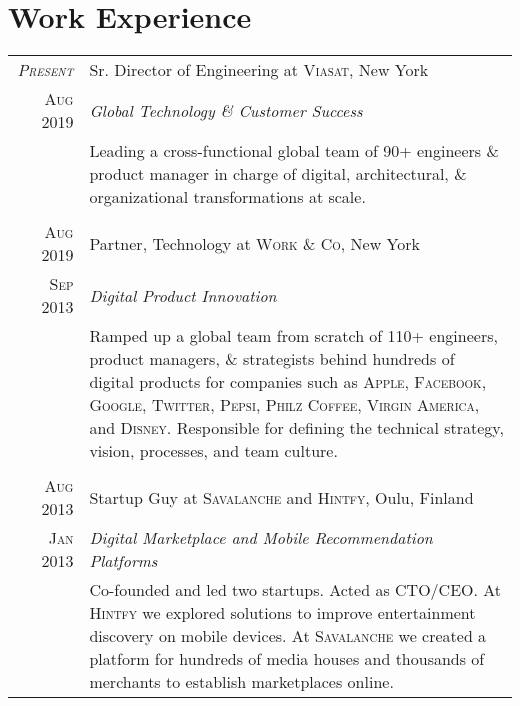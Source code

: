 \documentclass[a4paper,10pt]{article}
\begin{document}
\section{Work Experience}
\begin{tabular}{r|p{11cm}}
  \textsc{\emph{Present}} & Sr. Director of Engineering at \textsc{Viasat}, New York \\

  \textsc{Aug 2019} & \emph{Global Technology \& Customer Success}\\

  &\footnotesize{Leading a cross-functional global team of 90+
    engineers \& product manager in charge of digital, architectural,
    \& organizational transformations at scale.}\\

  \multicolumn{2}{c}{}\\

  \textsc{Aug 2019} & Partner, Technology at \textsc{Work \& Co}, New York \\

  \textsc{Sep 2013} & \emph{Digital Product Innovation}\\

  &\footnotesize{Ramped up a global team from scratch of 110+
    engineers, product managers, \& strategists behind hundreds of
    digital products for companies such as \textsc{Apple},
    \textsc{Facebook}, \textsc{Google}, \textsc{Twitter},
    \textsc{Pepsi}, \textsc{Philz Coffee}, \textsc{Virgin America},
    and \textsc{Disney}. Responsible for defining the technical
    strategy, vision, processes, and team culture.}\\

  \multicolumn{2}{c}{}\\

  \textsc{Aug 2013} & Startup Guy at \textsc{Savalanche} and \textsc{Hintfy}, Oulu, Finland \\

  \textsc{Jan 2013} & \emph{Digital Marketplace and Mobile Recommendation Platforms} \\

  &\footnotesize{Co-founded and led two startups. Acted as \textsc{CTO/CEO}. At
    \textsc{Hintfy} we explored solutions to improve entertainment discovery on
    mobile devices. At \textsc{Savalanche} we created a platform for hundreds of
    media houses and thousands of merchants to establish marketplaces online.}\\


\end{tabular}
\end{document}
